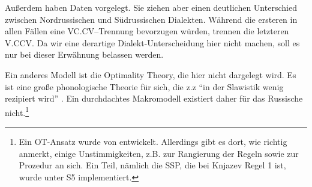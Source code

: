 \documentclass[12pt,headsepline,a4paper]{scrartcl}
\begin{document}
Außerdem haben \textcite{kalnyn1985} Daten vorgelegt. Sie ziehen aber einen deutlichen Unterschied zwischen Nordrussischen und Südrussischen Dialekten. Während die ersteren in allen Fällen eine VC.CV--Trennung bevorzugen würden, trennen die letzteren V.CCV. Da wir eine derartige Dialekt-Unterscheidung hier nicht machen, soll es nur bei dieser Erwähnung belassen werden.

Ein anderes Modell ist die Optimality Theory, die hier nicht dargelegt wird. Es ist eine große phonologische Theorie für sich, die z.z "`in der Slawistik wenig rezipiert wird"' \autocite[7]{kelih2012}. Ein durchdachtes Makromodell existiert daher für das Russische nicht.\footnote{Ein OT-Ansatz wurde von \textcite{knjazev1999} entwickelt. Allerdings gibt es dort, wie \autocite{kelih2012} richtig anmerkt, einige Unstimmigkeiten, z.B. zur Rangierung der Regeln sowie zur Prozedur an sich. Ein Teil, nämlich die SSP, die bei Knjazev Regel 1 ist, wurde unter S5 implementiert.}
 
\end{document}
